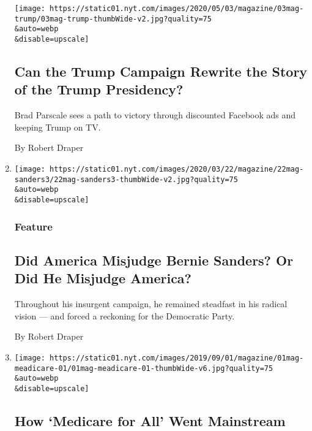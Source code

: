 \begin{enumerate}
  \texttt{[image: https://static01.nyt.com/images/2020/05/03/magazine/03mag-trump/03mag-trump-thumbWide-v2.jpg?quality=75\\\&auto=webp\\\&disable=upscale]}

  \hypertarget{can-the-trump-campaign-rewrite-the-story-of-the-trump-presidency}{%
  \subsection{Can the Trump Campaign Rewrite the Story of the Trump
  Presidency?}\label{can-the-trump-campaign-rewrite-the-story-of-the-trump-presidency}}

  Brad Parscale sees a path to victory through discounted Facebook ads
  and keeping Trump on TV.

  By Robert Draper
\item
  \href{/2020/03/16/magazine/bernie-sanders-campaign.html}{}

  \texttt{[image: https://static01.nyt.com/images/2020/03/22/magazine/22mag-sanders3/22mag-sanders3-thumbWide-v2.jpg?quality=75\\\&auto=webp\\\&disable=upscale]}

  \hypertarget{feature-2}{%
  \subsubsection{Feature}\label{feature-2}}

  \hypertarget{did-america-misjudge-bernie-sanders-or-did-he-misjudge-america}{%
  \subsection{Did America Misjudge Bernie Sanders? Or Did He Misjudge
  America?}\label{did-america-misjudge-bernie-sanders-or-did-he-misjudge-america}}

  Throughout his insurgent campaign, he remained steadfast in his
  radical vision --- and forced a reckoning for the Democratic Party.

  By Robert Draper
\item
  \href{/2019/08/27/magazine/medicare-for-all-democrats.html}{}

  \texttt{[image: https://static01.nyt.com/images/2019/09/01/magazine/01mag-meadicare-01/01mag-meadicare-01-thumbWide-v6.jpg?quality=75\\\&auto=webp\\\&disable=upscale]}

  \hypertarget{how-medicare-for-all-went-mainstream}{%
  \subsection{How `Medicare for All' Went
  Mainstream}\label{how-medicare-for-all-went-mainstream}}


\end{enumerate}
